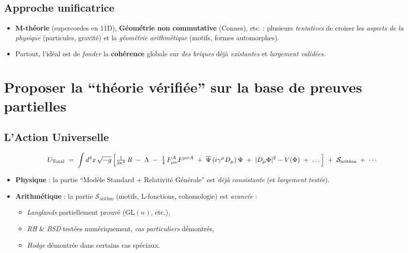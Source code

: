\documentclass[11pt]{article}
\begin{document}
\subsection{Approche unificatrice}
\begin{itemize}
  \item \textbf{M-théorie} (supercordes en 11D), \textbf{Géométrie non commutative} (Connes), etc. : plusieurs \emph{tentatives} de croiser les \emph{aspects de la physique} (particules, gravité) et la \emph{géométrie arithmétique} (motifs, formes automorphes).
  \item Partout, l'idéal est de \emph{fonder} la \textbf{cohérence} globale sur \emph{des briques} déjà \emph{existantes} et \emph{largement validées}.
\end{itemize}

\section{Proposer la “théorie vérifiée” sur la base de preuves partielles}

\subsection{L'Action Universelle}
\[
U_{\mathrm{Total}} 
\;=\;
\int d^4x\,\sqrt{-g}\,\Bigl[
  \tfrac{1}{2\kappa^2}\,R
  \;-\;\Lambda
  \;-\;\tfrac14\,F_{\mu\nu}^A F^{\mu\nu A}
  \;+\;\overline{\Psi}\,(i\gamma^\mu D_\mu)\,\Psi
  \;+\;|D_\mu \Phi|^2 - V(\Phi)
  \;+\;\dots
\Bigr]
\;+\;
\mathcal{S}_{\mathrm{arithm}}
\;+\;\cdots
\]
\begin{itemize}
  \item \textbf{Physique} : la partie “Modèle Standard + Relativité Générale” est \emph{déjà} \emph{consistante} (et \emph{largement testée}).
  \item \textbf{Arithmétique} : la partie \(\mathcal{S}_{\mathrm{arithm}}\) (motifs, L-fonctions, cohomologie) est \emph{avancée} : 
    \begin{itemize}
      \item \emph{Langlands} partiellement prouvé (\(\mathrm{GL}(n)\), etc.),
      \item \emph{RH} \& \emph{BSD} testées numériquement, \emph{cas particuliers} démontrés,
      \item \emph{Hodge} démontrée dans certains cas spéciaux.
    \end{itemize}
\end{itemize}
\end{document}
